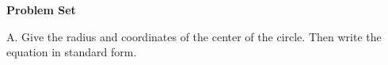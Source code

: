 \def\curdir{/storage/emulated/0/Documents/documents/latex/1920/Grade-10/3rd/equation-and-graph-of-a-circle/fb}

\textbf{Problem Set}

\vspce

A. Give the radius and coordinates of the center of the circle. Then write the equation in standard form. 
\begin{enumerate}[label = \arabic*. ]

\begin{multicols}{3}
\item 
\item 
\item 
\item 
\item 
\item 
\end{multicols} 
\end{enumerate}  
